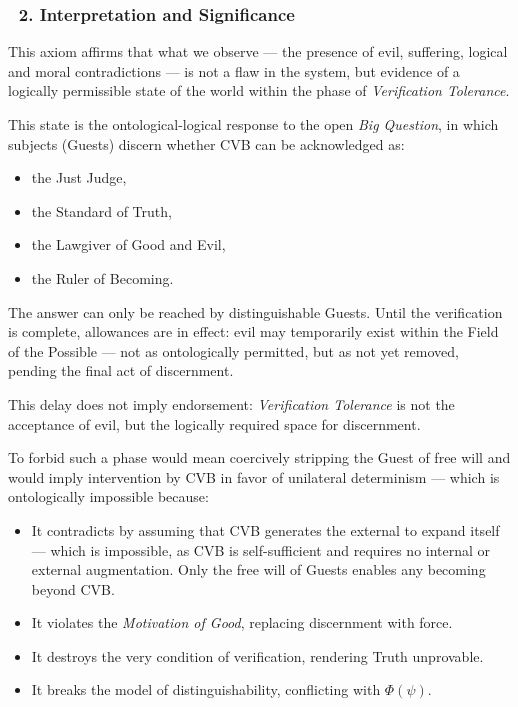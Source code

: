 \documentclass[12pt]{article}
\begin{document}
\subsubsection*{🔹 2. Interpretation and Significance}

This axiom affirms that what we observe — the presence of evil, suffering, logical and moral contradictions — is not a flaw in the system, but evidence of a logically permissible state of the world within the phase of \textit{Verification Tolerance}.

This state is the ontological-logical response to the open \textit{Big Question}, in which subjects (Guests) discern whether CVB can be acknowledged as:

\begin{itemize}
\item the Just Judge,
\item the Standard of Truth,
\item the Lawgiver of Good and Evil,
\item the Ruler of Becoming.
\end{itemize}

The answer can only be reached by distinguishable Guests. Until the verification is complete, allowances are in effect: evil may temporarily exist within the Field of the Possible — not as ontologically permitted, but as not yet removed, pending the final act of discernment.

This delay does not imply endorsement: \textit{Verification Tolerance} is not the acceptance of evil, but the logically required space for discernment.

To forbid such a phase would mean coercively stripping the Guest of free will and would imply intervention by CVB in favor of unilateral determinism — which is ontologically impossible because:

\begin{itemize}
\item It contradicts \text{[13]} by assuming that CVB generates the external to expand itself — which is impossible, as CVB is self-sufficient and requires no internal or external augmentation. Only the free will of Guests enables any becoming beyond CVB.
\item It violates the \textit{Motivation of Good}, replacing discernment with force.
\item It destroys the very condition of verification, rendering Truth unprovable.
\item It breaks the model of distinguishability, conflicting with \text{[11.1.1]} $\Phi(\psi)$.
\end{itemize}
\end{document}
